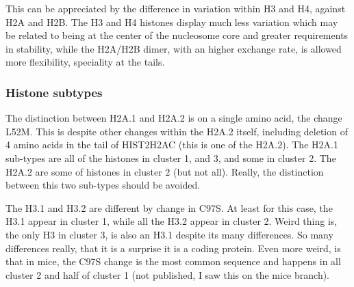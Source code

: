     This can be appreciated by the difference in variation within H3 and H4,
    against H2A and H2B. The H3 and H4 histones display much less variation
    which may be related to being at the center of the nucleosome core and greater
    requirements in stability, while the H2A/H2B dimer, with an higher exchange
    rate, is allowed more flexibility, speciality at the tails.


    \subsubsection{Histone subtypes}

    The distinction between H2A.1 and H2A.2 is on a single amino acid, the
    change L52M. This is despite other changes within the H2A.2 itself,
    including deletion of 4 amino acids in the tail of HIST2H2AC (this is
    one of the H2A.2). The H2A.1 sub-types are all of the histones in cluster
    1, and 3, and some in cluster 2. The H2A.2 are some of histones in
    cluster 2 (but not all). Really, the distinction between this two
    sub-types should be avoided.

    The H3.1 and H3.2 are different by change in C97S. At least for this case,
    the H3.1 appear in cluster 1, while all the H3.2 appear in cluster 2.
    Weird thing is, the only H3 in cluster 3, is also an H3.1 despite its
    many differences. So many differences really, that it is a surprise it
    is a coding protein. Even more weird, is that in mice, the C97S change
    is the most common sequence and happens in all cluster 2 and half of
    cluster 1 (not published, I saw this on the mice branch).

